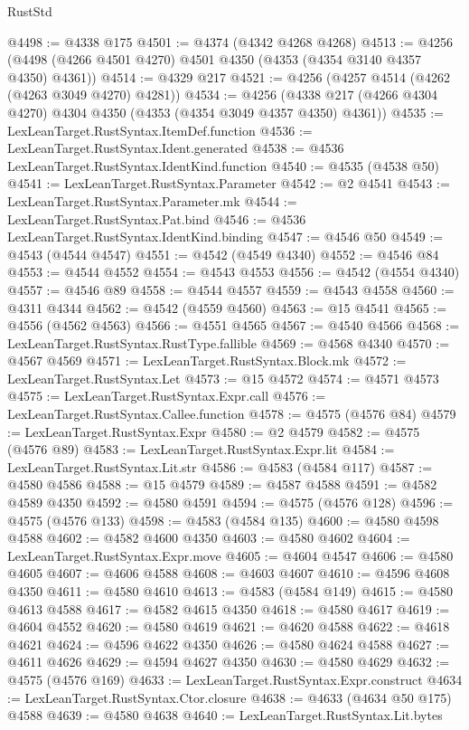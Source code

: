 \begin{lexlean}{RustStd}
\begin{coremodule}
@4498 := @4338 @175
@4501 := @4374 (@4342 @4268 @4268)
@4513 := @4256 (@4498 (@4266 @4501 @4270) @4501 @4350 (@4353 (@4354 @3140 @4357 @4350) @4361))
@4514 := @4329 @217
@4521 := @4256 (@4257 @4514 (@4262 (@4263 @3049 @4270) @4281))
@4534 := @4256 (@4338 @217 (@4266 @4304 @4270) @4304 @4350 (@4353 (@4354 @3049 @4357 @4350) @4361))
@4535 := LexLeanTarget.RustSyntax.ItemDef.function
@4536 := LexLeanTarget.RustSyntax.Ident.generated
@4538 := @4536 LexLeanTarget.RustSyntax.IdentKind.function
@4540 := @4535 (@4538 @50)
@4541 := LexLeanTarget.RustSyntax.Parameter
@4542 := @2 @4541
@4543 := LexLeanTarget.RustSyntax.Parameter.mk
@4544 := LexLeanTarget.RustSyntax.Pat.bind
@4546 := @4536 LexLeanTarget.RustSyntax.IdentKind.binding
@4547 := @4546 @50
@4549 := @4543 (@4544 @4547)
@4551 := @4542 (@4549 @4340)
@4552 := @4546 @84
@4553 := @4544 @4552
@4554 := @4543 @4553
@4556 := @4542 (@4554 @4340)
@4557 := @4546 @89
@4558 := @4544 @4557
@4559 := @4543 @4558
@4560 := @4311 @4344
@4562 := @4542 (@4559 @4560)
@4563 := @15 @4541
@4565 := @4556 (@4562 @4563)
@4566 := @4551 @4565
@4567 := @4540 @4566
@4568 := LexLeanTarget.RustSyntax.RustType.fallible
@4569 := @4568 @4340
@4570 := @4567 @4569
@4571 := LexLeanTarget.RustSyntax.Block.mk
@4572 := LexLeanTarget.RustSyntax.Let
@4573 := @15 @4572
@4574 := @4571 @4573
@4575 := LexLeanTarget.RustSyntax.Expr.call
@4576 := LexLeanTarget.RustSyntax.Callee.function
@4578 := @4575 (@4576 @84)
@4579 := LexLeanTarget.RustSyntax.Expr
@4580 := @2 @4579
@4582 := @4575 (@4576 @89)
@4583 := LexLeanTarget.RustSyntax.Expr.lit
@4584 := LexLeanTarget.RustSyntax.Lit.str
@4586 := @4583 (@4584 @117)
@4587 := @4580 @4586
@4588 := @15 @4579
@4589 := @4587 @4588
@4591 := @4582 @4589 @4350
@4592 := @4580 @4591
@4594 := @4575 (@4576 @128)
@4596 := @4575 (@4576 @133)
@4598 := @4583 (@4584 @135)
@4600 := @4580 @4598 @4588
@4602 := @4582 @4600 @4350
@4603 := @4580 @4602
@4604 := LexLeanTarget.RustSyntax.Expr.move
@4605 := @4604 @4547
@4606 := @4580 @4605
@4607 := @4606 @4588
@4608 := @4603 @4607
@4610 := @4596 @4608 @4350
@4611 := @4580 @4610
@4613 := @4583 (@4584 @149)
@4615 := @4580 @4613 @4588
@4617 := @4582 @4615 @4350
@4618 := @4580 @4617
@4619 := @4604 @4552
@4620 := @4580 @4619
@4621 := @4620 @4588
@4622 := @4618 @4621
@4624 := @4596 @4622 @4350
@4626 := @4580 @4624 @4588
@4627 := @4611 @4626
@4629 := @4594 @4627 @4350
@4630 := @4580 @4629
@4632 := @4575 (@4576 @169)
@4633 := LexLeanTarget.RustSyntax.Expr.construct
@4634 := LexLeanTarget.RustSyntax.Ctor.closure
@4638 := @4633 (@4634 @50 @175) @4588
@4639 := @4580 @4638
@4640 := LexLeanTarget.RustSyntax.Lit.bytes

\end{coremodule}
\end{lexlean}
